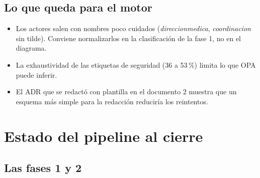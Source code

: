 \documentclass[11pt,a4paper]{report}
\begin{document}
\section{Lo que queda para el motor}

\begin{itemize}
\item Los actores salen con nombres poco cuidados (\emph{direccionmedica}, \emph{coordinacion} sin
tilde). Conviene normalizarlos en la clasificación de la fase 1, no en el diagrama.
\item La exhaustividad de las etiquetas de seguridad (36 a 53\,\%) limita lo que OPA puede inferir.
\item El ADR que se redactó con plantilla en el documento 2 muestra que un esquema más simple para la
redacción reduciría los reintentos.
\end{itemize}

\chapter{Estado del pipeline al cierre}

\section{Las fases 1 y 2}
\end{document}
